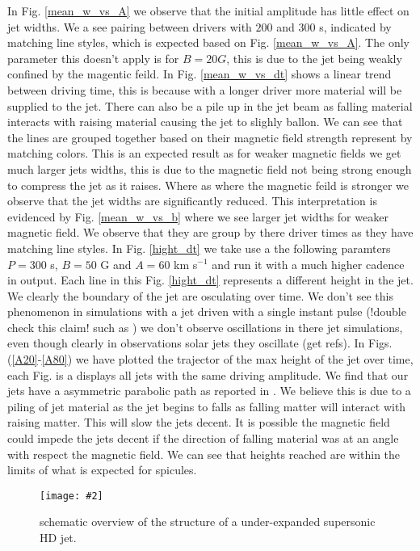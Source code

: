 \documentclass[12pt]{ociamthesis}
\newcommand{\fref}[1]{Fig. \eqref{#1}}
\newcommand{\mfig}[4]{
  \begin{figure}
  \begin{center}
  \texttt{[image: \#2]}
  \caption{#3}
  \label{#4}
  \end{center}
  \end{figure}}
\begin{document}
\par In \fref{mean_w_vs_A} we observe that the initial amplitude has little effect on jet widths. We a see pairing between drivers with $200$ and $300$ s, indicated by matching line styles, which is expected based on \fref{mean_w_vs_A}. The only parameter this doesn't apply is for $B=20 G$, this is due to the jet being weakly confined by the magentic feild. In \fref{mean_w_vs_dt} shows a linear trend between driving time, this is because with a longer driver more material will be supplied to the jet. There can also be a pile up in the jet beam as falling material interacts with raising material causing the jet to slighly ballon. We can see that the lines are grouped together based on their magnetic field strength represent by matching colors. This is an expected result as for weaker magnetic fields we get much larger jets widths, this is due to the magnetic field not being strong enough to compress the jet as it raises. Where as where the magnetic feild is stronger we observe that the jet widths are significantly reduced. This interpretation is evidenced by \fref{mean_w_vs_b} where we see larger jet widths for weaker magnetic field. We observe that they are group by there driver times as they have matching line styles. In \fref{hight_dt} we take use a the following paramters $P=300$ s, $B=50$ G and $A=60$ km s$^{-1}$ and run it with a much higher cadence in output. Each line in this \fref{hight_dt} represents a different height in the jet. We clearly the boundary of the jet are osculating over time. We don't see this phenomenon in simulations with a jet driven with a single instant pulse (!double check this claim! such as \citep{kuz2017ApJ,Singh2019}) we don't observe oscillations in there jet simulations, even though clearly in observations solar jets they oscillate (get refs). In Figs. (\ref{A20}-\ref{A80}) we have plotted the trajector of the max height of the jet over time, each Fig. is a displays all jets with the same driving amplitude. We find that our jets have a asymmetric parabolic path as reported in \cite{Singh2019}. We believe this is due to a piling of jet material as the jet begins to falls as falling matter will interact with raising matter. This will slow the jets decent. It is possible the magnetic field could impede the jets decent if the direction of falling material was at an angle with respect the magnetic field. We can see that heights reached are within the limits of what is expected for spicules. 
\mfig{0.8}{figures/jet_diagram.eps}{schematic overview of the structure of a under-expanded supersonic HD jet.}{cartoon_jet_waves}
\end{document}
